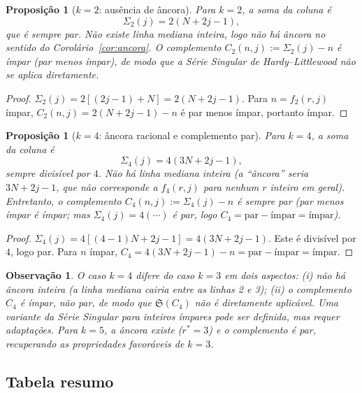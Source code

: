 \documentclass[12pt, a4paper]{article}
\newtheorem{proposicao}[lema]{Proposição}
\newtheorem{observacao}[lema]{Observação}
\begin{document}
	\begin{proposicao}[$k=2$: ausência de âncora]
		\label{prop:k2}
		Para $k=2$, a soma da coluna é
		\[
		\Sigma_2(j) = 2(N+2j-1),
		\]
		que é sempre par. Não existe linha mediana inteira, logo não há âncora no sentido
		do Corolário~\ref{cor:ancora}. O complemento $C_2(n,j):=\Sigma_2(j)-n$ é ímpar
		(par menos ímpar), de modo que a Série Singular de Hardy–Littlewood não se aplica
		diretamente.
	\end{proposicao}
	
	\begin{proof}
		$\Sigma_2(j)=2[(2j-1)+N]= 2(N+2j-1)$. Para $n=f_2(r,j)$ ímpar,
		$C_2(n,j)=2(N+2j-1)-n$ é par menos ímpar, portanto ímpar.
	\end{proof}
	
	\begin{proposicao}[$k=4$: âncora racional e complemento par]
		\label{prop:k4}
		Para $k=4$, a soma da coluna é
		\[
		\Sigma_4(j) = 4(3N+2j-1),
		\]
		sempre divisível por $4$. Não há linha mediana inteira (a ``âncora'' seria
		$3N+2j-1$, que não corresponde a $f_4(r,j)$ para nenhum $r$ inteiro em geral).
		Entretanto, o complemento $C_4(n,j):=\Sigma_4(j)-n$ é \emph{sempre par}
		(par menos ímpar é ímpar; mas $\Sigma_4(j)=4(\cdots)$ é par, logo $C_4=\text{par}-\text{ímpar}=\text{ímpar}$).
	\end{proposicao}
	
	\begin{proof}
		$\Sigma_4(j)=4[(4-1)N+2j-1]=4(3N+2j-1)$. Este é divisível por $4$, logo par.
		Para $n$ ímpar, $C_4=4(3N+2j-1)-n=\text{par}-\text{ímpar}=\text{ímpar}$.
	\end{proof}
	
	\begin{observacao}
		O caso $k=4$ difere do caso $k=3$ em dois aspectos: (i) não há âncora inteira
		(a linha mediana cairia entre as linhas 2 e 3); (ii) o complemento $C_4$ é ímpar,
		não par, de modo que $\mathfrak{S}(C_4)$ não é diretamente aplicável. Uma variante
		da Série Singular para inteiros ímpares pode ser definida, mas requer adaptações.
		Para $k=5$, a âncora existe ($r^*=3$) e o complemento é par, recuperando as
		propriedades favoráveis de $k=3$.
	\end{observacao}
	
	\subsection{Tabela resumo}
	
\end{document}
